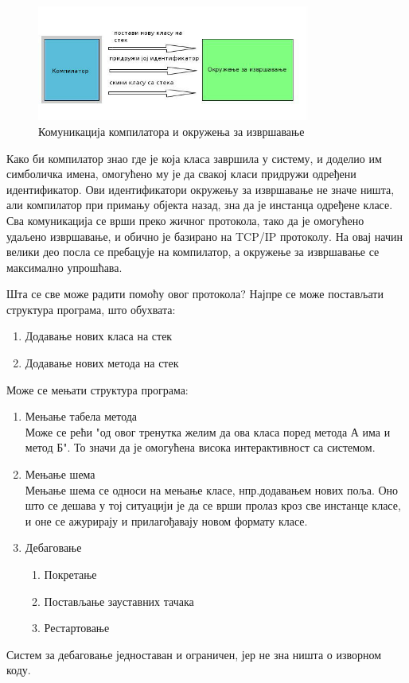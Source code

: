 \documentclass[12pt,oneside]{memoir}
\begin{document}
\begin{figure}[!ht]
  \centering
  \includegraphics[width=0.8\textwidth]{compiler.jpg}
  \caption{Комуникација компилатора и окружења за извршавање}
  \label{fig:komunikacija}
\end{figure}

Како би компилатор знао где је која класа завршила у систему, и доделио им симболичка имена, омогућено му је да свакој класи придружи одређени идентификатор. Ови идентификатори окружењу за извршавање не значе ништа, али компилатор при примању објекта назад, зна да је инстанца одређене класе.
Сва комуникација се врши преко жичног протокола, тако да је омогућено удаљено извршавање, и обично је базирано на TCP/IP протоколу. На овај начин велики део посла се пребацује на компилатор, а окружење за извршавање се максимално упрошћава.

Шта се све може радити помоћу овог протокола? Најпре се може постављати структура програма, што обухвата:
\begin{enumerate}
\item Додавање нових класа на стек
\item Додавање нових метода на стек
\end{enumerate}
Може се мењати структура програма:
\begin{enumerate}
\item Мењање табела метода\\
Може се рећи "од овог тренутка желим да ова класа поред метода А има и метод Б". То значи да је омогућена висока интерактивност са системом.
\item Мењање шема\\
Мењање шема се односи на мењање класе, нпр.додавањем нових поља. Оно што се дешава у тој ситуацији је да се врши пролаз кроз све инстанце класе, и оне се ажурирају и прилагођавају новом формату класе.
\item Дебаговање
\begin{enumerate}
\item Покретање
\item Постављање зауставних тачака
\item Рестартовање
\end{enumerate}
\end{enumerate}
Систем за дебаговање једноставан и ограничен, јер не зна ништа о изворном коду.
\end{document}

